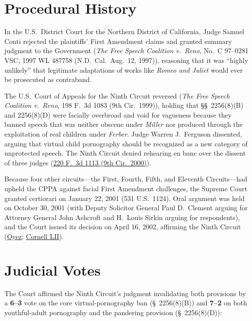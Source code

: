 \documentclass[12pt]{article}
\begin{document}
\section{Procedural History}

In the U.S.\ District Court for the Northern District of California, Judge Samuel Conti rejected the plaintiffs' First Amendment claims and granted summary judgment to the Government (\textit{The Free Speech Coalition v.\ Reno}, No.\ C 97--0281 VSC, 1997 WL 487758 (N.D.\ Cal.\ Aug.\ 12, 1997)), reasoning that it was ``highly unlikely'' that legitimate adaptations of works like \textit{Romeo and Juliet} would ever be prosecuted as contraband.

The U.S.\ Court of Appeals for the Ninth Circuit reversed (\textit{The Free Speech Coalition v.\ Reno}, 198 F.\ 3d 1083 (9th Cir.\ 1999)), holding that \S\S~2256(8)(B) and 2256(8)(D) were facially overbroad and void for vagueness because they banned speech that was neither obscene under \textit{Miller} nor produced through the exploitation of real children under \textit{Ferber}. Judge Warren J.\ Ferguson dissented, arguing that virtual child pornography should be recognized as a new category of unprotected speech. The Ninth Circuit denied rehearing en banc over the dissent of three judges (\href{https://law.justia.com/cases/federal/appellate-courts/F3/220/1113/625466/}{220 F.\ 3d 1113 (9th Cir.\ 2000)}).

Because four other circuits---the First, Fourth, Fifth, and Eleventh Circuits---had upheld the CPPA against facial First Amendment challenges, the Supreme Court granted certiorari on January 22, 2001 (531 U.S.\ 1124). Oral argument was held on October 30, 2001 (with Deputy Solicitor General Paul D.\ Clement arguing for Attorney General John Ashcroft and H.\ Louis Sirkin arguing for respondents), and the Court issued its decision on April 16, 2002, affirming the Ninth Circuit (\href{https://www.oyez.org/cases/2001/00-795}{Oyez}; \href{https://www.law.cornell.edu/supct/html/00-795.ZS.html}{Cornell LII}).

\section{Judicial Votes}

The Court affirmed the Ninth Circuit's judgment invalidating both provisions by a \textbf{6--3} vote on the core virtual-pornography ban (\S~2256(8)(B)) and \textbf{7--2} on both youthful-adult pornography and the pandering provision (\S~2256(8)(D)):
\end{document}
